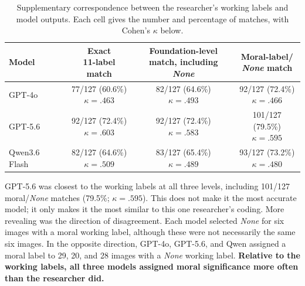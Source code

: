 \begin{table}[!htbp]
    \centering
    \caption{Supplementary correspondence between the researcher's working
    labels and model outputs. Each cell gives the number and percentage of
    matches, with Cohen's \(\kappa\) below.}
    \label{tab:researcher_model_correspondence}
    \footnotesize
    \setlength{\tabcolsep}{7pt}
    \begin{tabular}{lccc}
        \toprule
        Model & \shortstack{Exact\\11-label match} &
        \shortstack{Foundation-level\\match, including \textit{None}} &
        \shortstack{Moral-label/\\\textit{None} match} \\
        \midrule
        GPT-4o & \shortstack{77/127 (60.6\%)\\\(\kappa=.463\)} &
        \shortstack{82/127 (64.6\%)\\\(\kappa=.493\)} &
        \shortstack{92/127 (72.4\%)\\\(\kappa=.466\)} \\
        GPT-5.6 & \shortstack{92/127 (72.4\%)\\\(\kappa=.603\)} &
        \shortstack{92/127 (72.4\%)\\\(\kappa=.583\)} &
        \shortstack{101/127 (79.5\%)\\\(\kappa=.595\)} \\
        Qwen3.6 Flash & \shortstack{82/127 (64.6\%)\\\(\kappa=.509\)} &
        \shortstack{83/127 (65.4\%)\\\(\kappa=.489\)} &
        \shortstack{93/127 (73.2\%)\\\(\kappa=.480\)} \\
        \bottomrule
    \end{tabular}
\end{table}

GPT-5.6 was closest to the working labels at all three levels, including
101/127 moral/\textit{None} matches (79.5\%; \(\kappa=.595\)). This does not
make it the most accurate model; it only makes it the most similar to this one
researcher's coding. More revealing was the direction of disagreement. Each
model selected \textit{None} for six images with a moral working label,
although these were not necessarily the same six images. In the opposite
direction, GPT-4o, GPT-5.6, and Qwen assigned a moral label to 29, 20, and 28
images with a \textit{None} working label. \textbf{Relative to the working
labels, all three models assigned moral significance more often than the
researcher did.}

